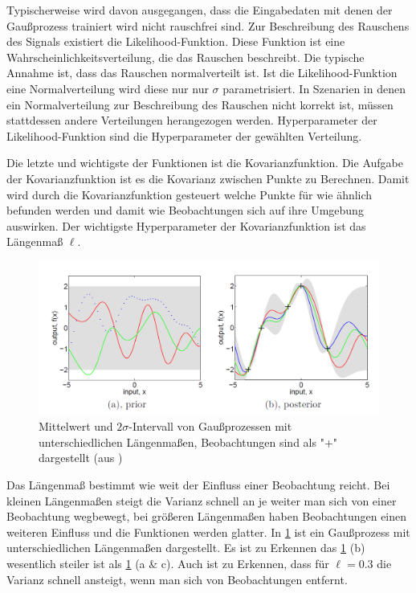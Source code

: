 Typischerweise wird davon ausgegangen, dass die Eingabedaten mit denen der Gaußprozess trainiert wird nicht rauschfrei sind.
Zur Beschreibung des Rauschens des Signals existiert die Likelihood-Funktion.
Diese Funktion ist eine Wahrscheinlichkeitsverteilung, die das Rauschen beschreibt.
Die typische Annahme ist, dass das Rauschen normalverteilt ist.
Ist die Likelihood-Funktion eine Normalverteilung wird diese nur nur $\sigma$ parametrisiert.
In Szenarien in denen ein Normalverteilung zur Beschreibung des Rauschen nicht korrekt ist, müssen stattdessen andere Verteilungen herangezogen werden.
Hyperparameter der Likelihood-Funktion sind die Hyperparameter der gewählten Verteilung.

Die letzte und wichtigste der Funktionen ist die Kovarianzfunktion.
Die Aufgabe der Kovarianzfunktion ist es die Kovarianz zwischen Punkte zu Berechnen.
Damit wird durch die Kovarianzfunktion gesteuert welche Punkte für wie ähnlich befunden werden und damit wie Beobachtungen sich auf ihre Umgebung auswirken.
Der wichtigste Hyperparameter der Kovarianzfunktion ist das Längenmaß $\ell$.
\begin{figure}[h]
	\centering
	\includegraphics[width=1\linewidth]{bilder/gp}
	\caption{Mittelwert und $2\sigma$-Intervall von Gaußprozessen mit unterschiedlichen Längenmaßen, Beobachtungen sind als "+" dargestellt (aus \cite{Rasmussen.2008})}
	\label{fig:lengthscale}
\end{figure}
Das Längenmaß bestimmt wie weit der Einfluss einer Beobachtung reicht.
Bei kleinen Längenmaßen steigt die Varianz schnell an je weiter man sich von einer Beobachtung wegbewegt, bei größeren Längenmaßen haben Beobachtungen einen weiteren Einfluss und die Funktionen werden glatter.
In \cref{fig:lengthscale} ist ein Gaußprozess mit unterschiedlichen Längenmaßen dargestellt.
Es ist zu Erkennen das \cref{fig:lengthscale} (b) wesentlich steiler ist als \cref{fig:lengthscale} (a \& c).
Auch ist zu Erkennen, dass für $\ell=0.3$ die Varianz schnell ansteigt, wenn man sich von Beobachtungen entfernt.
